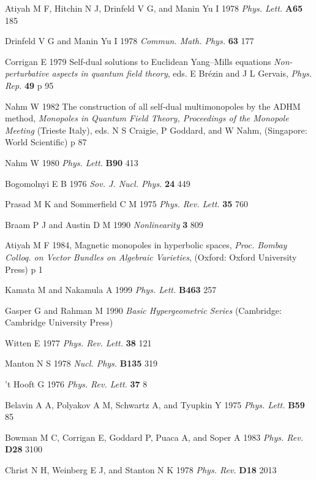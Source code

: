 \documentclass[a4paper,10pt]{article}
\begin{document}
\begin{thebibliography}{99}
 Atiyah M F, Hitchin N J, Drinfeld V G, and Manin Yu I 1978 {\it Phys. Lett.} \textbf{A65} 185

 Drinfeld V G and Manin Yu I 1978 {\it Commun. Math. Phys.} \textbf{63} 177

 Corrigan E 1979 Self-dual solutions to Euclidean Yang--Mills equations {\it Non-perturbative aspects in quantum field theory}, eds. E Br{\'e}zin and J L Gervais, {\it Phys. Rep.} \textbf{49} p 95


 Nahm W 1982 The construction of all self-dual multimonopoles by the ADHM method, {\it Monopoles in Quantum Field Theory, Proceedings of the Monopole Meeting} (Trieste Italy), eds. N S Craigie, P Goddard, and W Nahm, (Singapore: World Scientific) p 87

 Nahm W 1980 {\it Phys. Lett.} \textbf{B90} 413

 Bogomolnyi E B 1976 {\it Sov. J. Nucl. Phys.} \textbf{24} 449

 Prasad M K and Sommerfield C M 1975 {\it Phys. Rev. Lett.} \textbf{35} 760

 Braam P J and Austin D M 1990 {\it Nonlinearity} \textbf{3} 809

 Atiyah M F 1984, Magnetic monopoles in hyperbolic spaces, \textit{Proc. Bombay Colloq. on Vector Bundles on Algebraic Varieties}, (Oxford: Oxford University Press) p 1

 Kamata M and Nakamula A 1999 {\it Phys. Lett.} \textbf{B463} 257

 Gasper G and Rahman M 1990 {\it Basic Hypergeometric Series} (Cambridge: Cambridge University Press)
 
 Witten E 1977 {\it Phys. Rev. Lett.} \textbf{38} 121

 Manton N S 1978 {\it Nucl. Phys.} \textbf{B135} 319

 't Hooft G 1976 {\it Phys. Rev. Lett.} \textbf{37} 8

 Belavin A A, Polyakov A M, Schwartz A, and Tyupkin Y 1975 {\it Phys. Lett.} \textbf{B59} 85

 Bowman M C, Corrigan E, Goddard P, Puaca A, and Soper A 1983 {\it Phys. Rev.} \textbf{D28} 3100

 Christ N H, Weinberg E J, and Stanton N K 1978 {\it Phys. Rev.} \textbf{D18} 2013


\end{thebibliography}
\end{document}
